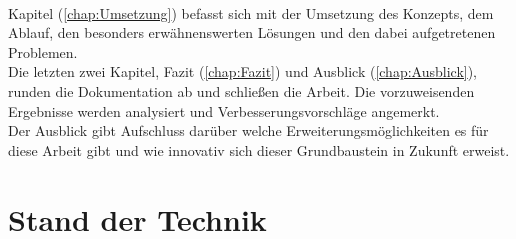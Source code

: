 \\ 
\linebreak
Kapitel (\ref{chap:Umsetzung}) befasst sich mit der Umsetzung des Konzepts, dem Ablauf, den besonders erwähnenswerten Lösungen und den 
dabei aufgetretenen Problemen.
\\ 
\linebreak 
Die letzten zwei Kapitel, Fazit (\ref{chap:Fazit}) und Ausblick (\ref{chap:Ausblick}), runden die Dokumentation ab und schließen die 
Arbeit. Die vorzuweisenden Ergebnisse werden analysiert und Verbesserungsvorschläge angemerkt.
\\ 
Der Ausblick gibt Aufschluss darüber welche Erweiterungsmöglichkeiten es für diese Arbeit gibt und wie innovativ sich dieser 
Grundbaustein in Zukunft erweist. 
\pagebreak

\section{Stand der Technik}
\label{chap:Stand der Technik}